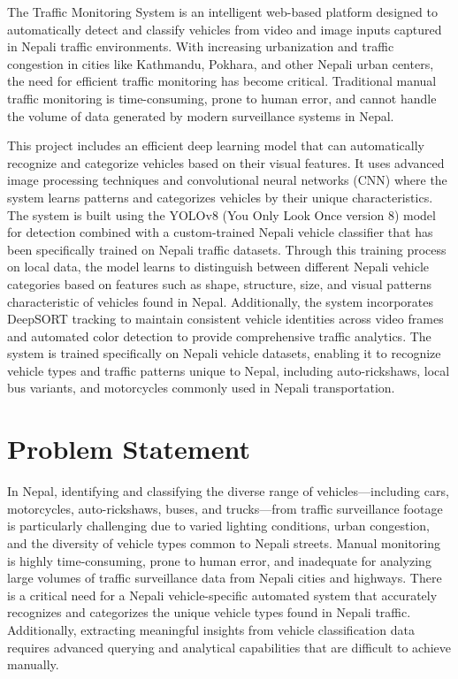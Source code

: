 \documentclass[12pt,a4paper]{report}
\begin{document}
The Traffic Monitoring System is an intelligent web-based platform designed to automatically detect and classify vehicles from video and image inputs captured in Nepali traffic environments. With increasing urbanization and traffic congestion in cities like Kathmandu, Pokhara, and other Nepali urban centers, the need for efficient traffic monitoring has become critical. Traditional manual traffic monitoring is time-consuming, prone to human error, and cannot handle the volume of data generated by modern surveillance systems in Nepal.

This project includes an efficient deep learning model that can automatically recognize and categorize vehicles based on their visual features. It uses advanced image processing techniques and convolutional neural networks (CNN) where the system learns patterns and categorizes vehicles by their unique characteristics. The system is built using the YOLOv8 (You Only Look Once version 8) model for detection combined with a custom-trained Nepali vehicle classifier that has been specifically trained on Nepali traffic datasets. Through this training process on local data, the model learns to distinguish between different Nepali vehicle categories based on features such as shape, structure, size, and visual patterns characteristic of vehicles found in Nepal. Additionally, the system incorporates DeepSORT tracking to maintain consistent vehicle identities across video frames and automated color detection to provide comprehensive traffic analytics. The system is trained specifically on Nepali vehicle datasets, enabling it to recognize vehicle types and traffic patterns unique to Nepal, including auto-rickshaws, local bus variants, and motorcycles commonly used in Nepali transportation.

\section{Problem Statement}

In Nepal, identifying and classifying the diverse range of vehicles—including cars, motorcycles, auto-rickshaws, buses, and trucks—from traffic surveillance footage is particularly challenging due to varied lighting conditions, urban congestion, and the diversity of vehicle types common to Nepali streets. Manual monitoring is highly time-consuming, prone to human error, and inadequate for analyzing large volumes of traffic surveillance data from Nepali cities and highways. There is a critical need for a Nepali vehicle-specific automated system that accurately recognizes and categorizes the unique vehicle types found in Nepali traffic. Additionally, extracting meaningful insights from vehicle classification data requires advanced querying and analytical capabilities that are difficult to achieve manually.
\end{document}
